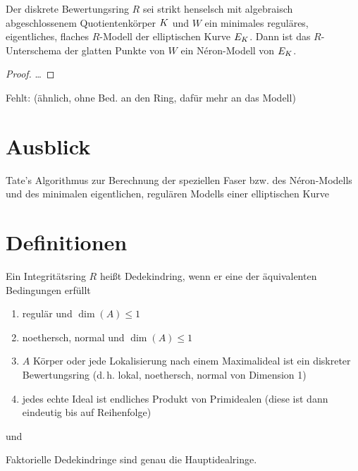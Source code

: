 \documentclass[german]{scrreprt}
\begin{document}
\begin{Satz}
  Der diskrete Bewertungsring $R$ sei strikt henselsch mit algebraisch
  abgeschlossenem Quotientenkörper $K$ und
  $W$ ein minimales reguläres, eigentliches, flaches $R$-Modell der
  elliptischen Kurve $E_{K}$.
  Dann ist das $R$-Unterschema der glatten Punkte von $W$ ein
  Néron-Modell von $E_{K}$.
  \cite[1.5, Proposition 1, S.\,21]{neron}
  \begin{proof}
    …
  \end{proof}

  Fehlt: \cite[Theorem IV.6.1]{silverman2}
  (ähnlich, ohne Bed. an den Ring, dafür mehr an das Modell)
\end{Satz}



\chapter{Ausblick}
Tate's Algorithmus zur Berechnung der speziellen Faser bzw. des
Néron-Modells und des minimalen eigentlichen, regulären Modells einer
elliptischen Kurve
\cite[IV.9]{silverman2}


\appendix
\chapter{Definitionen}
\begin{Definition}[Dedekindring]
Ein Integritätsring $R$ heißt Dedekindring, wenn er eine der
äquivalenten Bedingungen erfüllt
\begin{enumerate}[label=(\roman*)]
\item regulär und $\dim(A)\leq 1$
\item noethersch, normal und $\dim(A)\leq 1$
\item $A$ Körper oder
  jede Lokalisierung nach einem Maximalideal ist ein diskreter
  Bewertungsring
  (d.\,h. lokal, noethersch, normal von Dimension 1)
\item jedes echte Ideal ist endliches Produkt von Primidealen
  (diese ist dann eindeutig bis auf Reihenfolge) 
\end{enumerate}
\cite[S.\,40]{hartshorne} und \cite[Definition B.84]{wedhorn}

Faktorielle Dedekindringe sind genau die Hauptidealringe.
\cite[Proposition B.85]{wedhorn}
\end{Definition}
\end{document}
